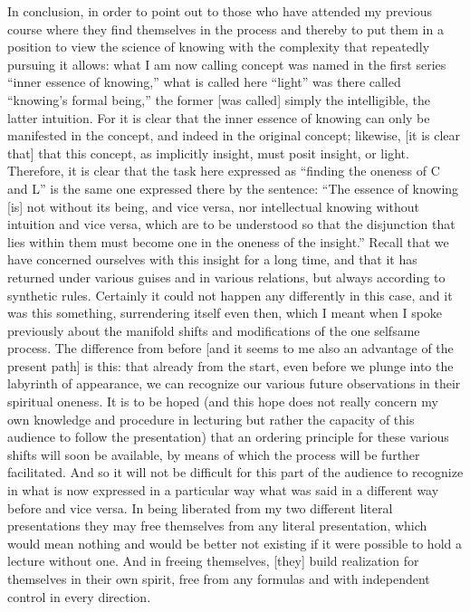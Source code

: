 In conclusion, in order to point out to those
who have attended my previous course
where they find themselves in the process
and thereby to put them in a position
to view the science of knowing with
the complexity that repeatedly pursuing it allows:
what I am now calling concept was named
in the first series “inner essence of knowing,”
what is called here “light”
was there called “knowing's formal being,”
the former [was called] simply the intelligible,
the latter intuition.
For it is clear that the inner essence of knowing
can only be manifested in the concept,
and indeed in the original concept;
likewise, [it is clear that] that this concept,
as implicitly insight, must posit insight, or light.
Therefore, it is clear that the task here expressed as
“finding the oneness of C and L” is
the same one expressed there by the sentence:
“The essence of knowing [is] not without its being, and vice versa,
nor intellectual knowing without intuition and vice versa,
which are to be understood so that the disjunction
that lies within them must become one
in the oneness of the insight.”
Recall that we have concerned ourselves with this
insight for a long time,
and that it has returned under various guises
and in various relations,
but always according to synthetic rules.
Certainly it could not happen any differently in this case,
and it was this something, surrendering itself even then,
which I meant when I spoke previously about the manifold shifts
and modifications of the one selfsame process.
The difference from before
[and it seems to me also an advantage of the present path]
is this:
that already from the start,
even before we plunge
into the labyrinth of appearance,
we can recognize our various future observations
in their spiritual oneness.
It is to be hoped
(and this hope does not really concern
my own knowledge and procedure in lecturing
but rather the capacity of this audience
to follow the presentation)
that an ordering principle for these various shifts
will soon be available,
by means of which the process will be further facilitated.
And so it will not be difficult for this part of the audience
to recognize in what is now expressed in a particular way
what was said in a different way before and vice versa.
In being liberated from my two different literal presentations
they may free themselves from any literal presentation,
which would mean nothing and would be better not existing
if it were possible to hold a lecture without one.
And in freeing themselves,
[they] build realization for themselves in their own spirit,
free from any formulas and with independent control in every direction.

